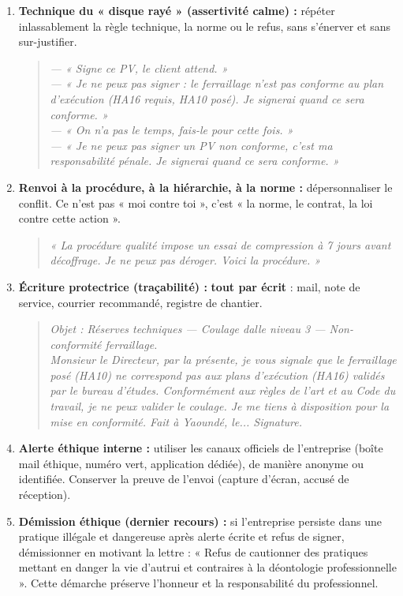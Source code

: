 \documentclass[11pt]{article}
\begin{document}
\begin{methode}
\begin{enumerate}
    \item \textbf{Technique du « disque rayé » (assertivité calme) :} répéter inlassablement la règle technique, la norme ou le refus, sans s'énerver et sans sur-justifier.
        \begin{quote}
        \emph{— « Signe ce PV, le client attend. »}\\
        \emph{— « Je ne peux pas signer : le ferraillage n'est pas conforme au plan d'exécution (HA16 requis, HA10 posé). Je signerai quand ce sera conforme. »}\\
        \emph{— « On n'a pas le temps, fais-le pour cette fois. »}\\
        \emph{— « Je ne peux pas signer un PV non conforme, c'est ma responsabilité pénale. Je signerai quand ce sera conforme. »}
        \end{quote}
    \item \textbf{Renvoi à la procédure, à la hiérarchie, à la norme :} dépersonnaliser le conflit. Ce n'est pas « moi contre toi », c'est « la norme, le contrat, la loi contre cette action ».
        \begin{quote}
        \emph{« La procédure qualité impose un essai de compression à 7 jours avant décoffrage. Je ne peux pas déroger. Voici la procédure. »}
        \end{quote}
    \item \textbf{Écriture protectrice (traçabilité) :} \textbf{tout par écrit} : mail, note de service, courrier recommandé, registre de chantier.
        \begin{quote}
        \emph{Objet : Réserves techniques — Coulage dalle niveau 3 — Non-conformité ferraillage.\\
        Monsieur le Directeur, par la présente, je vous signale que le ferraillage posé (HA10) ne correspond pas aux plans d'exécution (HA16) validés par le bureau d'études. Conformément aux règles de l'art et au Code du travail, je ne peux valider le coulage. Je me tiens à disposition pour la mise en conformité. Fait à Yaoundé, le... Signature.}
        \end{quote}
    \item \textbf{Alerte éthique interne :} utiliser les canaux officiels de l'entreprise (boîte mail éthique, numéro vert, application dédiée), de manière anonyme ou identifiée. Conserver la preuve de l'envoi (capture d'écran, accusé de réception).
    \item \textbf{Démission éthique (dernier recours) :} si l'entreprise persiste dans une pratique illégale et dangereuse après alerte écrite et refus de signer, démissionner en motivant la lettre : « Refus de cautionner des pratiques mettant en danger la vie d'autrui et contraires à la déontologie professionnelle ». Cette démarche préserve l'honneur et la responsabilité du professionnel.
\end{enumerate}
\end{methode}
\end{document}
